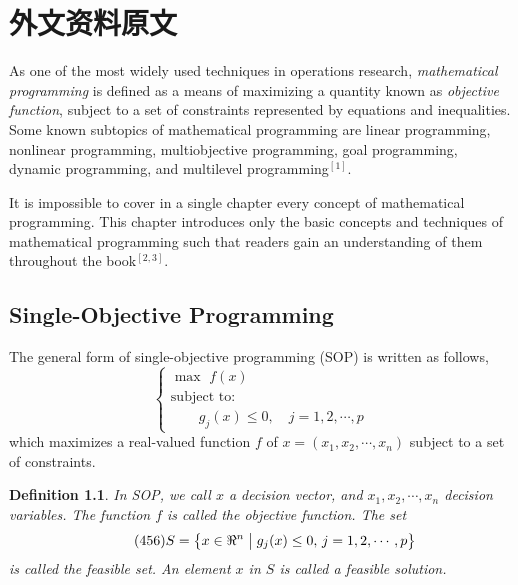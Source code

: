 
\chapter{外文资料原文}
\label{cha:engorg}
As one of the most widely used techniques in operations research, {\em
  mathematical programming} is defined as a means of maximizing a quantity known
as {\em objective function}, subject to a set of constraints represented by
equations and inequalities. Some known subtopics of mathematical programming are
linear programming, nonlinear programming, multiobjective programming, goal
programming, dynamic programming, and multilevel programming$^{[1]}$.

It is impossible to cover in a single chapter every concept of mathematical
programming. This chapter introduces only the basic concepts and techniques of
mathematical programming such that readers gain an understanding of them
throughout the book$^{[2,3]}$.


\section{Single-Objective Programming}
The general form of single-objective programming (SOP) is written
as follows,
\begin{equation}\tag*{(123)} %
\left\{\begin{array}{l}
\max \,\,f(x)\\[0.1 cm]
\mbox{subject to:} \\ [0.1 cm]
\qquad g_j(x)\le 0,\quad j=1,2,\cdots,p
\end{array}\right.
\end{equation}
which maximizes a real-valued function $f$ of
$x=(x_1,x_2,\cdots,x_n)$ subject to a set of constraints.

\newtheorem{mpdef}{Definition}[chapter]
\begin{mpdef}
In SOP, we call $x$ a decision vector, and
$x_1,x_2,\cdots,x_n$ decision variables. The function
$f$ is called the objective function. The set
\begin{equation}\tag*{(456)} %
S=\left\{x\in\Re^n\bigm|g_j(x)\le 0,\,j=1,2,\cdots,p\right\}
\end{equation}
is called the feasible set. An element $x$ in $S$ is called a
feasible solution.
\end{mpdef}

